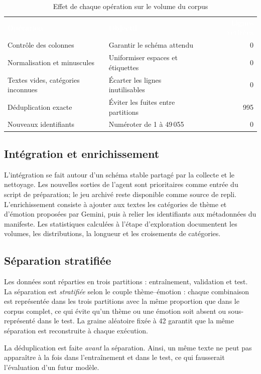 \documentclass[11pt,a4paper]{article}
\newcommand{\headtab}[1]{\textcolor{white}{\sffamily\bfseries #1}}
\begin{document}
\begin{table}[H]
\centering
\caption{Effet de chaque opération sur le volume du corpus}
\begin{tabularx}{\linewidth}{>{\small}p{5.7cm} X r}
\rowcolor{navy}\headtab{Opération} & \headtab{Objectif} & \headtab{Lignes retirées} \\
Contrôle des colonnes & Garantir le schéma attendu & 0 \\
Normalisation et minuscules & Uniformiser espaces et étiquettes & 0 \\
Textes vides, catégories inconnues & Écarter les lignes inutilisables & 0 \\
Déduplication exacte & Éviter les fuites entre partitions & 995 \\
Nouveaux identifiants & Numéroter de 1 à 49\,055 & 0 \\
\bottomrule
\end{tabularx}
\end{table}

\subsection{Intégration et enrichissement}
L'intégration se fait autour d'un schéma stable partagé par la collecte et le nettoyage. Les nouvelles sorties de l'agent sont prioritaires comme entrée du script de préparation; le jeu archivé reste disponible comme source de repli. L'enrichissement consiste à ajouter aux textes les catégories de thème et d'émotion proposées par Gemini, puis à relier les identifiants aux métadonnées du manifeste. Les statistiques calculées à l'étape d'exploration documentent les volumes, les distributions, la longueur et les croisements de catégories.

\subsection{Séparation stratifiée}
Les données sont réparties en trois partitions : entraînement, validation et test. La séparation est \emph{stratifiée} selon le couple thème--émotion : chaque combinaison est représentée dans les trois partitions avec la même proportion que dans le corpus complet, ce qui évite qu'un thème ou une émotion soit absent ou sous-représenté dans le test. La graine aléatoire fixée à 42 garantit que la même séparation est reconstruite à chaque exécution.

La déduplication est faite \emph{avant} la séparation. Ainsi, un même texte ne peut pas apparaître à la fois dans l'entraînement et dans le test, ce qui fausserait l'évaluation d'un futur modèle.
\end{document}
